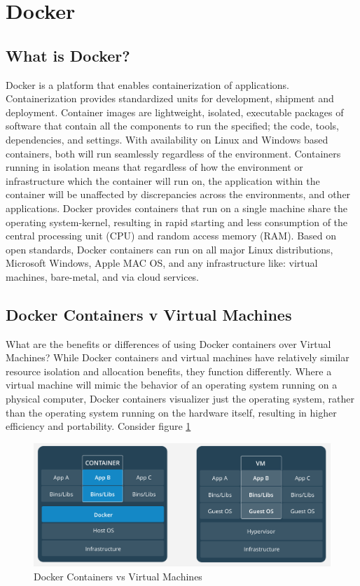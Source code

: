 \section{Docker}

\subsection{What is Docker?}
Docker is a platform that enables containerization of applications. Containerization provides standardized units for development, shipment and deployment. Container images are lightweight, isolated, executable packages of software that contain all the components to run the specified; the code, tools, dependencies, and settings. With availability on Linux and Windows based containers, both will run seamlessly regardless of the environment. Containers running in isolation means that regardless of how the environment or infrastructure which the container will run on, the application within the container will be unaffected by discrepancies across the environments, and other applications. Docker provides containers that run on a single machine share the operating system-kernel, resulting in rapid starting and less consumption of the central processing unit (CPU) and random access memory (RAM). Based on open standards, Docker containers can run on all major Linux distributions, Microsoft Windows, Apple MAC OS, and any infrastructure like: virtual machines, bare-metal, and via cloud services. 

\subsection{Docker Containers v Virtual Machines}
What are the benefits or differences of using Docker containers over Virtual Machines? 
While Docker containers and virtual machines have relatively similar resource isolation and allocation benefits, they function differently. Where a virtual machine will mimic the behavior of an operating system running on a physical computer, Docker containers visualizer just the operating system, rather than the operating system running on the hardware itself, resulting in higher efficiency and portability. Consider figure \ref{fig:containervsvm}

\begin{figure}
\includegraphics[width=\textwidth]{img/containervvm.PNG}
\caption{Docker Containers vs Virtual Machines}
\label{fig:containervsvm}
\end{figure}

